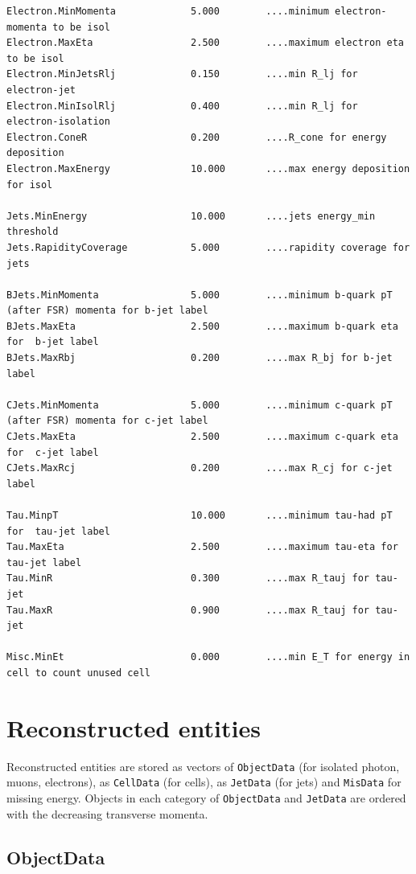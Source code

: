 {\begin{verbatim}
Electron.MinMomenta             5.000        ....minimum electron-momenta to be isol
Electron.MaxEta                 2.500        ....maximum electron eta to be isol
Electron.MinJetsRlj             0.150        ....min R_lj for electron-jet
Electron.MinIsolRlj             0.400        ....min R_lj for electron-isolation
Electron.ConeR                  0.200        ....R_cone for energy deposition 
Electron.MaxEnergy              10.000       ....max energy deposition for isol

Jets.MinEnergy                  10.000       ....jets energy_min  threshold
Jets.RapidityCoverage           5.000        ....rapidity coverage for jets

BJets.MinMomenta                5.000        ....minimum b-quark pT (after FSR) momenta for b-jet label
BJets.MaxEta                    2.500        ....maximum b-quark eta for  b-jet label
BJets.MaxRbj                    0.200        ....max R_bj for b-jet label

CJets.MinMomenta                5.000        ....minimum c-quark pT (after FSR) momenta for c-jet label
CJets.MaxEta                    2.500        ....maximum c-quark eta for  c-jet label
CJets.MaxRcj                    0.200        ....max R_cj for c-jet label

Tau.MinpT                       10.000       ....minimum tau-had pT for  tau-jet label
Tau.MaxEta                      2.500        ....maximum tau-eta for  tau-jet label
Tau.MinR                        0.300        ....max R_tauj for tau-jet
Tau.MaxR                        0.900        ....max R_tauj for tau-jet

Misc.MinEt                      0.000        ....min E_T for energy in cell to count unused cell
\end{verbatim}  
}

\newpage
\section{Reconstructed entities}

Reconstructed entities are stored as vectors of {\tt ObjectData} (for isolated photon, muons, electrons),
as {\tt CellData} (for cells), as {\tt JetData} (for jets) and {\tt MisData} for missing energy. 
Objects in each category of  {\tt ObjectData} and  {\tt JetData} are ordered 
with the decreasing transverse momenta.

\subsection{ ObjectData }

